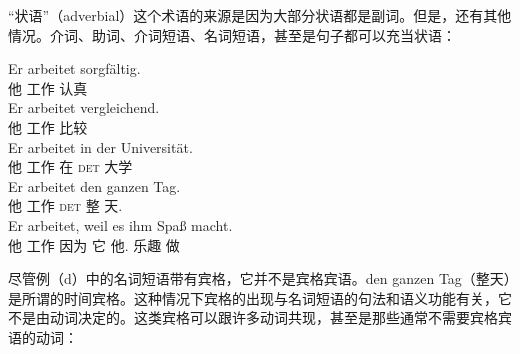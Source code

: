 “状语”（adverbial）这个术语的来源是因为大部分状语都是副词。但是，还有其他情况。介词、助词、介词短语、名词短语，甚至是句子都可以充当状语：

\eal
\ex 
\gll Er arbeitet sorgfältig.\\
	 他 工作 认真\\
\ex 
\gll Er arbeitet vergleichend.\\
	 他 工作 比较\\
\ex 
\gll Er arbeitet in der Universität.\\
	 他 工作 在 \textsc{det} 大学\\
\ex 
\gll Er arbeitet den ganzen Tag.\\
     他 工作 \textsc{det} 整 天.\acc\\
\ex 
\gll Er arbeitet, weil es ihm Spaß macht.\\
	 他 工作 因为 它 他.\dat{} 乐趣 做\\
\zl

\noindent
尽管例（d）中的名词短语带有宾格，它并不是宾格宾语。den ganzen Tag（整天）是所谓的时间宾格。这种情况下宾格的出现与名词短语的句法和语义功能有关，它不是由动词决定的。这类宾格可以跟许多动词共现，甚至是那些通常不需要宾格宾语的动词：

